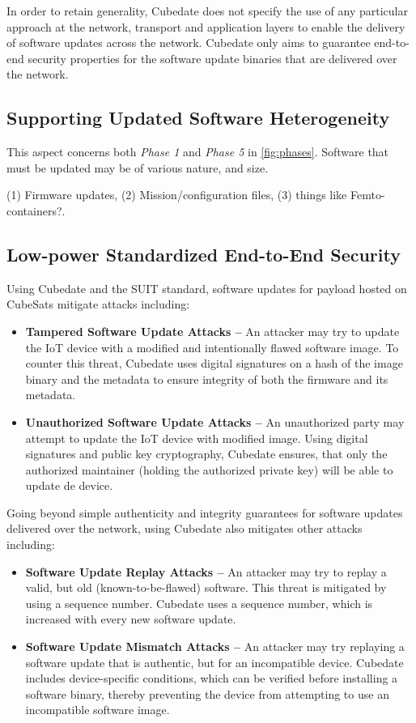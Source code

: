 In order to retain generality, Cubedate does not specify the use of any particular approach at the network, transport and application layers to enable the delivery of software updates across the network.
Cubedate only aims to guarantee end-to-end security properties for the software update binaries that are delivered over the network.

\subsection{Supporting Updated Software Heterogeneity}
This aspect concerns both \textit{Phase 1} and \textit{Phase 5} in \autoref{fig:phases}. 
Software that must be updated may be of various nature, and size.

(1) Firmware updates, (2) Mission/configuration files, (3) things like Femto-containers?.

\subsection{Low-power Standardized End-to-End Security}


Using Cubedate and the SUIT standard, software updates for payload hosted on CubeSats mitigate attacks including:

\begin{itemize}
\item {\bf Tampered Software Update Attacks –} An attacker may try to update the IoT device with a modified and intentionally flawed software image. To counter this threat, Cubedate uses digital signatures on a hash of the image binary and the metadata to ensure integrity of both the firmware and its metadata.

\item {\bf Unauthorized Software Update Attacks –} An unauthorized party may attempt to update the IoT device with modified image. Using digital signatures and public key cryptography, Cubedate ensures, that only the authorized maintainer (holding the authorized private key) will be able to update de device.
\end{itemize}

Going beyond simple authenticity and integrity guarantees for software updates delivered over the network, using Cubedate also mitigates other attacks including:
\begin{itemize}
\item {\bf Software Update Replay Attacks –} An attacker may try to replay a valid, but old (known-to-be-flawed) software. This threat is mitigated by using a sequence number. Cubedate uses a sequence number, which is increased with every new software update.

\item {\bf Software Update Mismatch Attacks –} An attacker may try replaying a software update that is authentic, but for an incompatible device. Cubedate includes device-specific conditions, which can be verified before installing a software binary, thereby preventing the device from attempting to use an incompatible software image.
\end{itemize}

